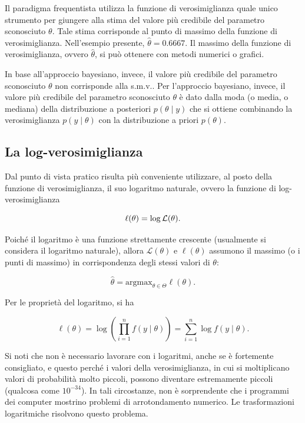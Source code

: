 \documentclass[
]{memoir}
\theoremstyle{definition}
\theoremstyle{definition}
\theoremstyle{definition}
\theoremstyle{definition}
\theoremstyle{remark}
\begin{document}
Il paradigma frequentista utilizza la funzione di verosimiglianza quale unico strumento per giungere alla stima del valore più credibile del parametro sconosciuto \(\theta\). Tale stima corrisponde al punto di massimo della funzione di verosimiglianza. Nell'esempio presente, \(\hat{\theta} = 0.6667\). Il massimo della funzione di verosimiglianza, ovvero \(\hat{\theta}\), si può ottenere con metodi numerici o grafici.

In base all'approccio bayesiano, invece, il valore più credibile del parametro sconosciuto \(\theta\) non corrisponde alla s.m.v.. Per l'approccio bayesiano, invece, il valore più credibile del parametro sconosciuto \(\theta\) è dato dalla moda (o media, o mediana) della distribuzione a posteriori \(p(\theta \mid y)\) che si ottiene combinando la verosimiglianza \(p(y \mid \theta)\) con la distribuzione a priori \(p(\theta)\).

\hypertarget{la-log-verosimiglianza}{%
\subsection{La log-verosimiglianza}\label{la-log-verosimiglianza}}

Dal punto di vista pratico risulta più conveniente utilizzare, al posto della funzione di verosimiglianza, il suo logaritmo naturale, ovvero la funzione di log-verosimiglianza

\begin{equation}
\ell(\theta) = \log \mathcal{L}(\theta).\notag
\end{equation}

Poiché il logaritmo è una funzione strettamente crescente (usualmente si considera il logaritmo naturale), allora \(\mathcal{L}(\theta)\) e \(\ell(\theta)\) assumono il massimo (o i punti di massimo) in corrispondenza degli stessi valori di \(\theta\):

\[
\hat{\theta} = \text{argmax}_{\theta \in \Theta} \ell(\theta).
\]

Per le proprietà del logaritmo, si ha

\begin{equation}
\ell(\theta) = \log \left( \prod_{i = 1}^n f(y \mid \theta) \right) = \sum_{i = 1}^n \log f(y \mid \theta).
\end{equation}

Si noti che non è necessario lavorare con i logaritmi, anche se è fortemente consigliato, e questo perché i valori della verosimiglianza, in cui si moltiplicano valori di probabilità molto piccoli, possono diventare estremamente piccoli (qualcosa come \(10^{-34}\)). In tali circostanze, non è sorprendente che i programmi dei computer mostrino problemi di arrotondamento numerico. Le trasformazioni logaritmiche risolvono questo problema.
\end{document}
